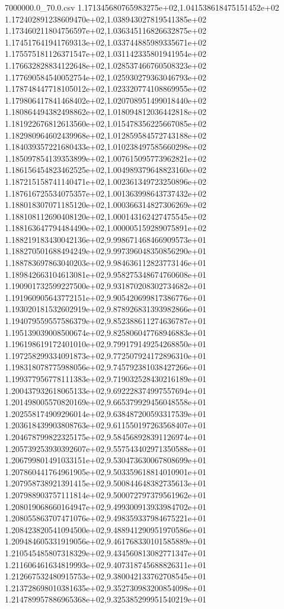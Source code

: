 \begin{filecontents*}{7000000.0_70.0.csv}
1.171345680765983275e+02,1.041538618475151452e+02
1.172402891238609470e+02,1.038943027819541385e+02
1.173460211804756597e+02,1.036345116826632875e+02
1.174517641941769313e+02,1.033744885989335671e+02
1.175575181126371547e+02,1.031142335801941954e+02
1.176632828834122648e+02,1.028537466760508323e+02
1.177690584540052754e+02,1.025930279363046793e+02
1.178748447718105012e+02,1.023320774108869955e+02
1.179806417841468402e+02,1.020708951499018440e+02
1.180864494382498862e+02,1.018094812036442818e+02
1.181922676812613560e+02,1.015478356225667085e+02
1.182980964602439968e+02,1.012859584572743188e+02
1.184039357221680433e+02,1.010238497585660298e+02
1.185097854139353899e+02,1.007615095773962821e+02
1.186156454823462525e+02,1.004989379648823160e+02
1.187215158741140471e+02,1.002361349723250896e+02
1.187616725534075357e+02,1.001363998643737432e+02
1.188018307071185120e+02,1.000366314827306269e+02
1.188108112690408120e+02,1.000143162427475545e+02
1.188163647794484490e+02,1.000005159289075891e+02
1.188219183430042136e+02,9.998671468466909573e+01
1.188270501688494249e+02,9.997396048350856290e+01
1.188783697863040203e+02,9.984636112823773146e+01
1.189842663104613081e+02,9.958275348674760608e+01
1.190901732599227500e+02,9.931870208302734682e+01
1.191960905643772151e+02,9.905420699817386776e+01
1.193020181532602919e+02,9.878926831393982866e+01
1.194079559557586379e+02,9.852388611274636787e+01
1.195139039008500674e+02,9.825806047768946883e+01
1.196198619172401010e+02,9.799179149254268850e+01
1.197258299334091873e+02,9.772507924172896310e+01
1.198318078775988056e+02,9.745792381038427266e+01
1.199377956778111383e+02,9.719032528430216189e+01
1.200437932618065133e+02,9.692228374997557694e+01
1.201498005570820169e+02,9.665379929456048558e+01
1.202558174909296014e+02,9.638487200593317539e+01
1.203618439903808763e+02,9.611550197263568407e+01
1.204678799822325175e+02,9.584568928391126974e+01
1.205739253930392607e+02,9.557543402971350588e+01
1.206799801491033151e+02,9.530473630067808699e+01
1.207860441764961905e+02,9.503359618814010901e+01
1.207958738921391415e+02,9.500844648382735613e+01
1.207988903757111814e+02,9.500072797379561962e+01
1.208019068660164947e+02,9.499300913933984702e+01
1.208055863707471076e+02,9.498359337984675221e+01
1.208423820541094500e+02,9.488941290951970586e+01
1.209484605331919056e+02,9.461768330101585889e+01
1.210545485807318329e+02,9.434560813082771347e+01
1.211606461634819993e+02,9.407318745688826311e+01
1.212667532480915753e+02,9.380042133762708545e+01
1.213728698010381635e+02,9.352730983200854098e+01
1.214789957886965368e+02,9.325385299951540219e+01

\end{filecontents*}
